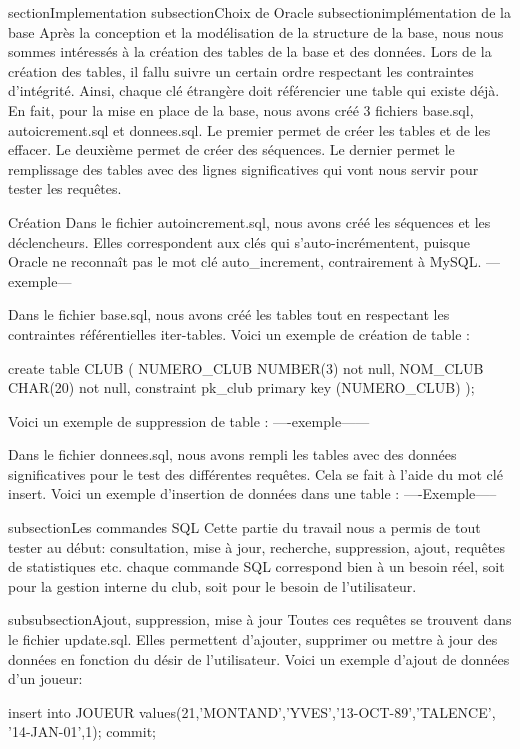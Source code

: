 section{Implementation}
subsection{Choix de Oracle}
subsection{implémentation de la base}
Après la conception et la modélisation de la structure de la base, nous nous sommes intéressés à la création des tables de la base et des données. 
Lors de la création des tables, il fallu suivre un certain ordre respectant les contraintes d'intégrité. Ainsi, chaque clé étrangère doit référencier 
une table qui existe déjà. En fait, pour la mise en place de la base, nous avons créé 3 fichiers base.sql, autoicrement.sql et donnees.sql. Le premier permet de créer les tables et de les effacer. Le deuxième permet de créer des séquences. Le dernier permet 
le remplissage des tables avec des lignes significatives qui vont nous servir pour tester les requêtes. 

Création
Dans le fichier autoincrement.sql, nous avons créé les séquences et les déclencheurs. Elles correspondent aux clés qui s'auto-incrémentent, puisque Oracle ne reconnaît pas le mot clé auto_increment, contrairement à MySQL.
---exemple---

Dans le fichier base.sql, nous avons créé les tables tout en respectant les contraintes référentielles iter-tables. Voici un exemple de création de table : 

create table CLUB
(
    NUMERO_CLUB                   NUMBER(3)			 not null,
    NOM_CLUB                      CHAR(20)               not null,	 
    constraint pk_club primary key (NUMERO_CLUB)
);

Voici un exemple de suppression de table :
----exemple------

Dans le fichier donnees.sql, nous avons rempli les tables avec des données significatives pour le test des différentes requêtes. Cela se fait à l'aide du mot clé insert. 
Voici un exemple d'insertion de données dans une table :
----Exemple-----

subsection{Les commandes SQL}
Cette partie du travail nous a permis de tout tester au début: consultation, mise à jour, recherche, suppression, ajout, requêtes de statistiques etc. 
chaque commande SQL correspond bien à un besoin réel, soit pour la gestion interne du club, soit pour le besoin de l'utilisateur.

subsubsection{Ajout, suppression, mise à jour}
Toutes ces requêtes se trouvent dans le fichier update.sql. Elles permettent d'ajouter, supprimer ou mettre à jour des données en fonction du désir de l'utilisateur.
Voici un exemple d'ajout de données d'un joueur:

insert into JOUEUR values(21,'MONTAND','YVES','13-OCT-89','TALENCE', '14-JAN-01',1);
commit;

